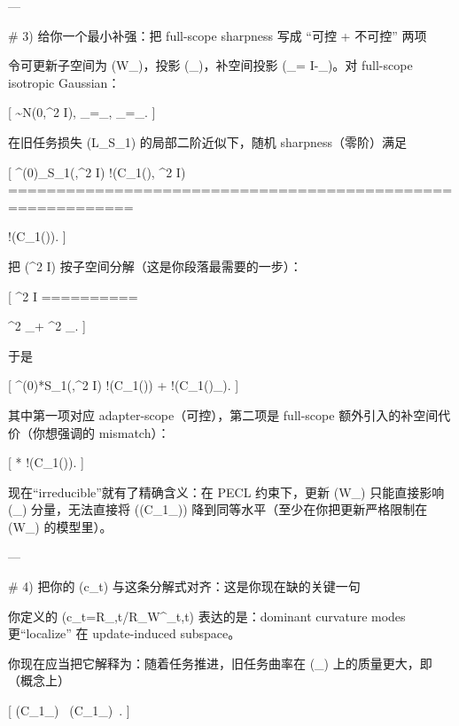 ---

# 3) 给你一个最小补强：把 full-scope sharpness 写成 “可控 + 不可控” 两项

令可更新子空间为 (\mathcal W_\Delta)，投影 (\Pi_\Delta)，补空间投影 (\Pi_\perp = I-\Pi_\Delta)。对 full-scope isotropic Gaussian：

[
\varepsilon \sim \mathcal N(0,\sigma^2 I),
\quad
\varepsilon_\Delta=\Pi_\Delta \varepsilon,\quad
\varepsilon_\perp=\Pi_\perp \varepsilon.
]

在旧任务损失 (\hat L_{S_1}) 的局部二阶近似下，随机 sharpness（零阶）满足

[
^{(0)}_{S_1}(\theta,\sigma^2 I)
\approx
{} !\big(C_1(\theta), \sigma^2 I\big)
===========================================================

!\big(C_1(\theta)\big).
]

把 (\sigma^2 I) 按子空间分解（这是你段落最需要的一步）：

[
\sigma^2 I
==========

\sigma^2 \Pi_\Delta + \sigma^2 \Pi_\perp.
]

于是

[
^{(0)}*{S_1}(\theta,\sigma^2 I)
\approx
{}!\big(C_1(\theta)\Pi*\Delta\big)
+
!\big(C_1(\theta)\Pi_\perp\big).
]

其中第一项对应 adapter-scope（可控），第二项是 full-scope 额外引入的补空间代价（你想强调的 mismatch）：

[
\Delta {}*{}
\approx
{}!\big(C_1(\theta)\Pi*\perp\big).
]

现在“irreducible”就有了精确含义：在 PECL 约束下，更新 (\delta\in\mathcal W_\Delta) 只能直接影响 (\Pi_\Delta) 分量，无法直接将 ((C_1\Pi_\perp)) 降到同等水平（至少在你把更新严格限制在 (\mathcal W_\Delta) 的模型里）。

---

# 4) 把你的 (c_t) 与这条分解式对齐：这是你现在缺的关键一句

你定义的 (c_t=R_{\Delta,t}/R_{W^{}_t,t}) 表达的是：dominant curvature modes 更“localize” 在 update-induced subspace。

你现在应当把它解释为：随着任务推进，旧任务曲率在 (\Pi_\Delta) 上的质量更大，即（概念上）

[
(C_1\Pi_\Delta)\ \quad
{}(C_1\Pi_\perp)\ .
]

